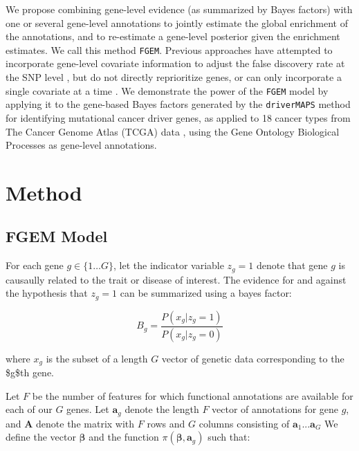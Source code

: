 We propose combining gene-level evidence (as summarized by Bayes factors) with one or several gene-level annotations to jointly estimate the global enrichment of the annotations, and to re-estimate a gene-level posterior given the enrichment estimates. We call this method \texttt{FGEM}.  Previous approaches have attempted to incorporate gene-level covariate information to adjust the false discovery rate at the SNP level \cite{Zablocki_2014}, but do not directly reprioritize genes, or can only incorporate a single covariate at a time \cite{rss-e}.  We demonstrate the power of the \texttt{FGEM} model by applying it to the gene-based Bayes factors generated by the \texttt{driverMAPS} method for identifying mutational cancer driver genes, as applied to 18 cancer types from The Cancer Genome Atlas (TCGA) data \cite{TCGA} \cite{drivermaps}, using the Gene Ontology Biological Processes as gene-level annotations.




\section{Method}\label{sec:org4822ac5}

\subsection{FGEM Model}\label{sec:org4e93496}

For each gene \(g \in \{1 \dots G\}\), let the indicator variable \(z_g=1\) denote that gene \(g\) is causaully related to the trait or disease of interest.  The evidence for and against the hypothesis that \(z_g=1\) can be summarized using a bayes factor:

$$B_g=\frac{P(x_g|z_g=1)}{P(x_g|z_g=0)}$$

where \(x_g\) is the subset of a length $G$ vector of genetic data corresponding to the \$g\$th gene.

Let \(F\) be the number of features for which functional annotations are available for each of our \(G\) genes.  Let \(\textbf{a}_g\) denote the length \(F\) vector of annotations for gene \(g\), and \(\textbf{A}\) denote the matrix with \(F\) rows and \(G\) 
columns consisting of \(\textbf{a}_1 ...  \textbf{a}_G\)
We define the vector \(\boldsymbol{\beta}\) and the function \(\pi(\boldsymbol{\beta},\textbf{a}_g)\) such that:

